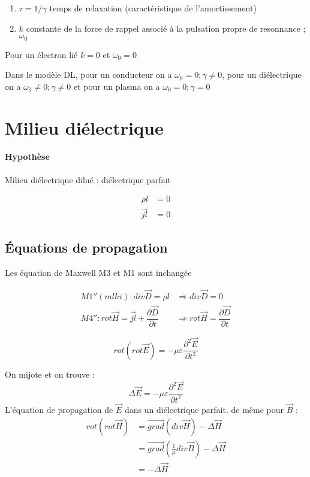 \documentclass[12pt,a4paper]{report}
\begin{document}
\begin{enumerate}
	\item \(\tau = 1/\gamma\) temps de relaxation (caractéristique de l'amortissement)
	\item \(k\) constante de la force de rappel associé à la pulsation propre de resonnance ; \(\omega_0\)
\end{enumerate}
Pour un électron lié \(k = 0\) et \(\omega_0 = 0\)

Dans le modèle DL, pour un conducteur on a \(\omega_0 = 0; \gamma \neq 0\), pour un diélectrique on a \(\omega_0 \neq 0; \gamma \neq 0 \) et pour un plasma on a \(\omega_0 = 0; \gamma = 0\)

\section{Milieu diélectrique}

\paragraph{Hypothèse} Milieu diélectrique dilué : diélectrique parfait

\begin{align*}
	\rho l &= 0\\
	\vec	{jl} &= 0
\end{align*}

\subsection{Équations de propagation}

Les équation de Maxwell M3 et M1 sont inchangée

\begin{align*}
	M1''(mlhi) : div\vec{D} = \rho l &\Rightarrow div \vec{D} = 0\\
	M4'' : rot \vec{H} = \vec{jl} +  \dfrac{\partial \vec{D}}{\partial t} &\Rightarrow rot \vec{H} = \dfrac{\partial \vec{D}}{\partial t}
\end{align*}

\[
	rot (rot\vec{E}) = - \mu \varepsilon \dfrac{\partial^2 \vec{E}}{\partial t^2}
\]

On mijote et on trouve :
\[
	\Delta \vec{E} = - \mu \varepsilon \dfrac{\partial^2 \vec{E}}{\partial t^2}
\]
L'équation de propagation de \(\vec{E}\) dans un diélectrique parfait.
de même pour \(\vec{B}\) :
\begin{align*}
	rot (rot \vec{H}) &= \vec{grad} (div \vec{H}) - \Delta \vec{H}\\
	&= \vec{grad} (\frac{1}{\mu} div \vec{B}) - \Delta \vec{H}\\
	&= -\Delta \vec{H}
\end{align*}
\end{document}
